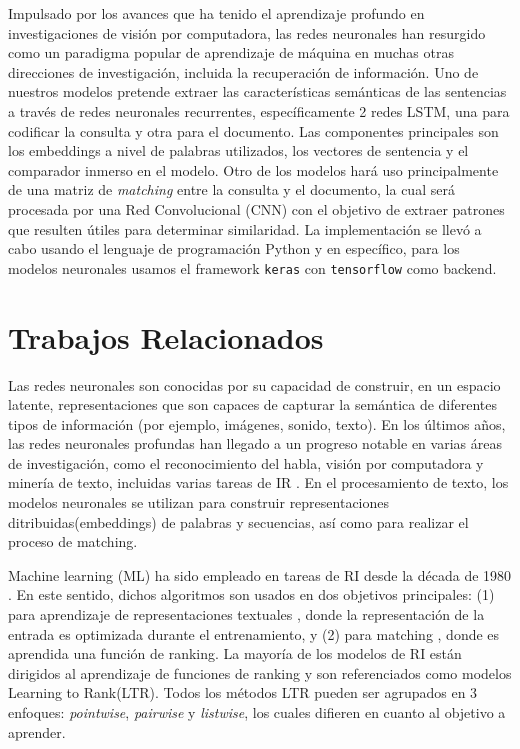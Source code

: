 \documentclass{llncs}
\begin{document}
Impulsado por los avances que ha tenido el aprendizaje profundo en investigaciones de visión por computadora, las redes neuronales han resurgido como un paradigma popular de aprendizaje de máquina en muchas otras direcciones de investigación, incluida la recuperación de información. Uno de nuestros modelos pretende extraer las características semánticas de las sentencias a través de redes neuronales recurrentes, específicamente 2 redes LSTM, una para codificar la consulta y otra para el documento. Las componentes principales son los embeddings a nivel de palabras utilizados, los vectores de sentencia y el comparador inmerso en el modelo. Otro de los modelos hará uso principalmente de una matriz de \textit{matching} entre la consulta y el documento, la cual será procesada por una Red Convolucional (CNN) con el objetivo de extraer patrones que resulten útiles para determinar similaridad. La implementación se llevó a cabo usando el lenguaje de programación Python y en específico, para los modelos neuronales usamos el framework \texttt{keras} con \texttt{tensorflow} como backend.   
%
\section{Trabajos Relacionados}
%
Las redes neuronales son conocidas por su capacidad de construir, en un espacio latente, representaciones que son capaces de capturar la semántica de diferentes tipos de información (por ejemplo, imágenes, sonido, texto). En los últimos años, las redes neuronales profundas han llegado a un progreso notable en varias áreas de investigación, como el reconocimiento del habla, visión por computadora y minería de texto, incluidas varias tareas de IR \cite{11}. En el procesamiento de texto, los modelos neuronales se utilizan para construir representaciones ditribuidas(embeddings) de palabras y secuencias, así como para realizar el proceso de matching.

Machine learning (ML) ha sido empleado en tareas de RI desde la década de 1980 \cite{206}. En este sentido, dichos algoritmos son usados en dos objetivos principales: (1) para aprendizaje de representaciones textuales \cite{12}\cite{55}, donde la representación de la entrada es optimizada durante el entrenamiento, y (2) para matching \cite{185,207}, donde es aprendida una función de ranking. La mayoría de los modelos de RI están dirigidos al aprendizaje de funciones de ranking \cite{205,208,209,210,211} y son referenciados como modelos Learning to Rank(LTR). Todos los métodos LTR pueden ser agrupados \cite{207} en 3 enfoques: \textit{pointwise}, \textit{pairwise} y \textit{listwise}, los cuales difieren en cuanto al objetivo a aprender. 
\end{document}
